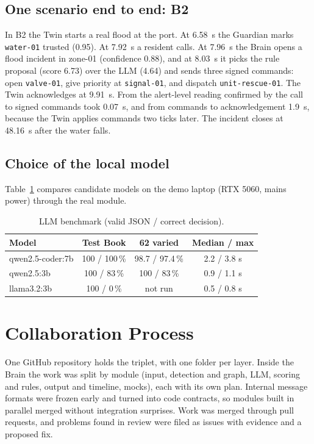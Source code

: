 \documentclass[conference]{IEEEtran}
\newcommand{\code}[1]{\texttt{\small #1}}
\begin{document}


\subsection{One scenario end to end: B2}
In B2 the Twin starts a real flood at the port. At 6.58~s the Guardian marks \code{water-01} trusted (0.95). At 7.92~s a resident
calls. At 7.96~s the Brain opens a flood incident in zone-01 (confidence 0.88), and at 8.03~s it picks the rule proposal
(score 6.73) over the LLM (4.64) and sends three signed commands: open \code{valve-01}, give priority at \code{signal-01}, and dispatch
\code{unit-rescue-01}. The Twin acknowledges at 9.91~s. From the alert-level reading confirmed by the call to signed commands took 0.07~s, and
from commands to acknowledgement 1.9~s, because the Twin applies commands two ticks later. The incident closes at 48.16~s after the
water falls.

\subsection{Choice of the local model}
Table~\ref{tab:llm} compares candidate models on the demo laptop (RTX 5060, mains power) through the real module.

\begin{table}[t]
\centering
\caption{LLM benchmark (valid JSON / correct decision).}
\label{tab:llm}
\footnotesize
\begin{tabular}{@{}l c c c@{}}
\toprule
\textbf{Model} & \textbf{Test Book} & \textbf{62 varied} & \textbf{Median / max}\\
\midrule
qwen2.5-coder:7b & 100 / 100\,\% & 98.7 / 97.4\,\% & 2.2 / 3.8 s\\
qwen2.5:3b & 100 / 83\,\% & 100 / 83\,\% & 0.9 / 1.1 s\\
llama3.2:3b & 100 / 0\,\% & not run & 0.5 / 0.8 s\\
\bottomrule
\end{tabular}
\par{}
\end{table}

\section{Collaboration Process}
One GitHub repository holds the triplet, with one folder per layer. Inside the Brain the work was split by module (input,
detection and graph, LLM, scoring and rules, output and timeline, mocks), each with its own plan. Internal message formats
were frozen early and turned into code contracts, so modules built in parallel merged without integration surprises. Work was merged through
pull requests, and problems found in review were filed as issues with evidence and a proposed fix.
\end{document}
